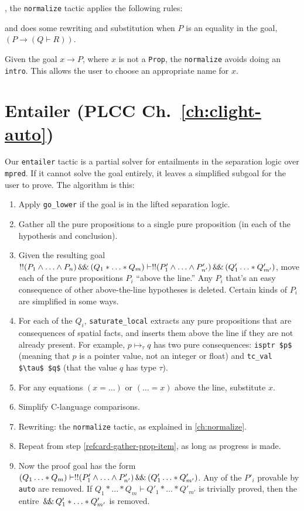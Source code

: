 \documentclass[12pt,fleqn,openany,oneside,showtrims]{memoir}
\newcommand{\ychapter}[2]{\chapter[#1]{#1 \hfill \normalsize #2}}
\begin{document}
, the
\lstinline{normalize} tactic applies the following rules:
and does some rewriting and substitution
when $P$ is an equality in the goal,
$(P \rightarrow (Q\vdash R))$.

Given the goal $x \rightarrow P$, where $x$ is not
a \lstinline{Prop}, the \lstinline{normalize} avoids
doing an \lstinline{intro}.  This allows the user
to choose an appropriate name for $x$.

\ychapter{Entailer}{(PLCC Ch.~\ref{ch:clight-auto})}
\label{refcard:entailer}
Our \lstinline{entailer} tactic is a partial solver
for entailments in the separation logic over \lstinline{mpred}.
If it cannot solve the goal entirely, it leaves a simplified
subgoal for the user to prove.  The algorithm is this:
\begin{enumerate}
\item Apply \lstinline{go_lower} if the goal is in the lifted
separation logic.
\item Gather all the pure propositions to a single pure proposition
\label{refcard-gather-prop-item}
(in each of the hypothesis and conclusion).
\item Given the resulting goal $!! (P_1 \wedge \ldots \wedge P_n) \,\mathsf{\&\hspace{-.2em}\&}\, (Q_1*\ldots*Q_m) \vdash !! (P'_1 \wedge \ldots \wedge P'_{n'}) \,\mathsf{\&\hspace{-.2em}\&}\, (Q'_1\ldots*Q'_{m'})$, 
move each of the pure propositions $P_i$ ``above the line.''  Any $P_i$ that's
an easy consequence of other above-the-line hypotheses is deleted.
Certain kinds of $P_i$ are simplified in some ways.
\item For each of the $Q_i$, \lstinline{saturate_local} extracts any
pure propositions that are consequences of spatial facts, and inserts
them above the line if they  are not already present.  For example,
$p \mapsto_\tau q$ has two pure consequences: \lstinline{isptr $p$}
(meaning that $p$ is a pointer value, not an integer or float)
and \lstinline{tc_val $\tau$ $q$} (that the value $q$ has type $\tau$).
\item For any equations $(x=\ldots)$ or $(\ldots=x)$ above the line,
substitute $x$.
\item Simplify C-language comparisons.
\item Rewriting: the \lstinline{normalize}
tactic, as explained in \autoref{ch:normalize}.
\item Repeat from step \ref{refcard-gather-prop-item}, as long as progress is made.
\item Now the proof goal has the form
$(Q_1\ldots*Q_m) \vdash !! (P'_1 \wedge \ldots \wedge P'_{n'}) \,\mathsf{\&\hspace{-.2em}\&}\, (Q'_1\ldots*Q'_{m'})$.
Any of the $P'_i$ provable by \lstinline{auto} are removed.
If $Q_1*\ldots*Q_m \vdash Q'_1*\ldots*Q'_{m'}$ is trivially
proved, then the entire $\,\mathsf{\&\hspace{-.2em}\&}\, Q'_1*\ldots*Q'_{m'}$ is removed.
\end{enumerate}
\end{document}
